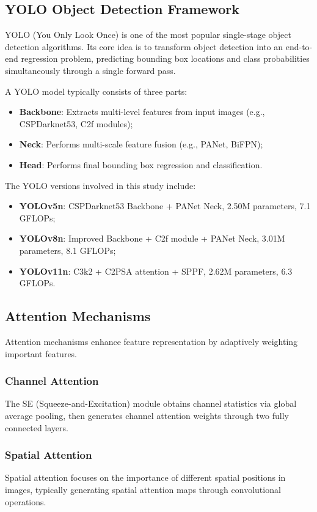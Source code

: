\documentclass[12pt,a4paper]{article}
\begin{document}
\subsection{YOLO Object Detection Framework}

YOLO (You Only Look Once) is one of the most popular single-stage object detection algorithms. Its core idea is to transform object detection into an end-to-end regression problem, predicting bounding box locations and class probabilities simultaneously through a single forward pass.

A YOLO model typically consists of three parts:
\begin{itemize}[noitemsep]
  \item \textbf{Backbone}: Extracts multi-level features from input images (e.g., CSPDarknet53, C2f modules);
  \item \textbf{Neck}: Performs multi-scale feature fusion (e.g., PANet, BiFPN);
  \item \textbf{Head}: Performs final bounding box regression and classification.
\end{itemize}

The YOLO versions involved in this study include:
\begin{itemize}[noitemsep]
  \item \textbf{YOLOv5n}: CSPDarknet53 Backbone + PANet Neck, 2.50M parameters, 7.1 GFLOPs;
  \item \textbf{YOLOv8n}: Improved Backbone + C2f module + PANet Neck, 3.01M parameters, 8.1 GFLOPs;
  \item \textbf{YOLOv11n}: C3k2 + C2PSA attention + SPPF, 2.62M parameters, 6.3 GFLOPs.
\end{itemize}

\subsection{Attention Mechanisms}

Attention mechanisms enhance feature representation by adaptively weighting important features.

\subsubsection{Channel Attention}
The SE (Squeeze-and-Excitation) module obtains channel statistics via global average pooling, then generates channel attention weights through two fully connected layers.

\subsubsection{Spatial Attention}
Spatial attention focuses on the importance of different spatial positions in images, typically generating spatial attention maps through convolutional operations.
\end{document}
